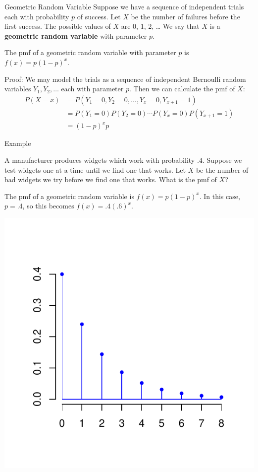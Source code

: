 \documentclass[xcolor=table]{beamer}
\renewcommand{\emph}{\textbf}
\begin{document}
\begin{frame}{Geometric Random Variable}
Suppose we have a sequence of independent trials each with probability $p$ of success. Let $X$ be the number of failures before the first success. The possible values of $X$ are 0, 1, 2, \dots 
We say that $X$ is a \emph{geometric random variable} with parameter $p$.

\begin{block}{}
The pmf of a geometric random variable with parameter $p$ is $f(x)=p(1-p)^x$.
\end{block}

\pause \vspace{.2cm}
Proof: We may model the trials as a sequence of independent Bernoulli random variables $Y_1, Y_2, \dots$ each with parameter $p$. Then we can calculate the pmf of $X$:
\begin{align*}
P(X=x)&=P(Y_1=0, Y_2=0, \dots, Y_x=0, Y_{x+1}=1)\\
&= P(Y_1=0)P(Y_2=0)\cdots P(Y_x=0)P(Y_{x+1}=1)\\
&= (1-p)^xp
\end{align*}
\end{frame}

\begin{frame}{Example}
\begin{block}{}A manufacturer produces widgets which work with probability $.4$. Suppose we test widgets one at a time until we find one that works. Let $X$ be the number of bad widgets we try before we find one that works. What is the pmf of $X$?
\end{block}

\pause
The pmf of a geometric random variable is $f(x)=p(1-p)^x$. In this case, $p=.4$, so this becomes $f(x)=.4(.6)^x$.

\vspace{-1cm}
\begin{center}
\includegraphics[scale=.6]{ch3_pmf4.pdf}
\end{center}

\end{frame}
\end{document}
